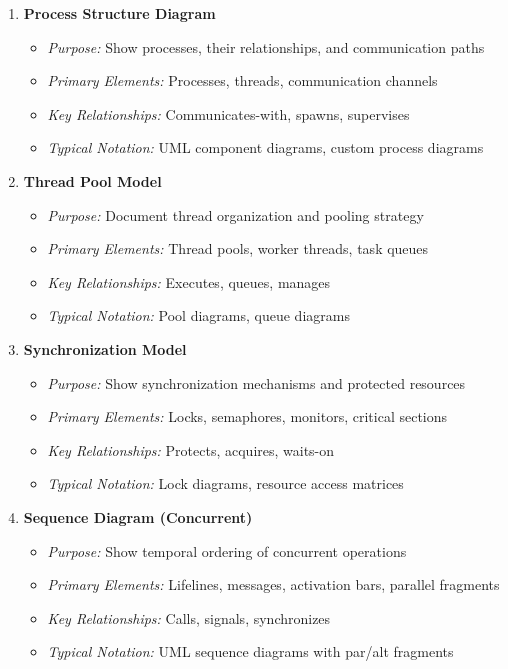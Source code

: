 \documentclass[11pt,letterpaper]{article}
\begin{document}
\begin{enumerate}[label=\textbf{MT\arabic*:}, leftmargin=2.5em]
    \item \textbf{Process Structure Diagram}
    \begin{itemize}[nosep]
        \item \textit{Purpose:} Show processes, their relationships, and communication paths
        \item \textit{Primary Elements:} Processes, threads, communication channels
        \item \textit{Key Relationships:} Communicates-with, spawns, supervises
        \item \textit{Typical Notation:} UML component diagrams, custom process diagrams
    \end{itemize}
    
    \item \textbf{Thread Pool Model}
    \begin{itemize}[nosep]
        \item \textit{Purpose:} Document thread organization and pooling strategy
        \item \textit{Primary Elements:} Thread pools, worker threads, task queues
        \item \textit{Key Relationships:} Executes, queues, manages
        \item \textit{Typical Notation:} Pool diagrams, queue diagrams
    \end{itemize}
    
    \item \textbf{Synchronization Model}
    \begin{itemize}[nosep]
        \item \textit{Purpose:} Show synchronization mechanisms and protected resources
        \item \textit{Primary Elements:} Locks, semaphores, monitors, critical sections
        \item \textit{Key Relationships:} Protects, acquires, waits-on
        \item \textit{Typical Notation:} Lock diagrams, resource access matrices
    \end{itemize}
    
    \item \textbf{Sequence Diagram (Concurrent)}
    \begin{itemize}[nosep]
        \item \textit{Purpose:} Show temporal ordering of concurrent operations
        \item \textit{Primary Elements:} Lifelines, messages, activation bars, parallel fragments
        \item \textit{Key Relationships:} Calls, signals, synchronizes
        \item \textit{Typical Notation:} UML sequence diagrams with par/alt fragments
    \end{itemize}
    

\end{enumerate}
\end{document}
